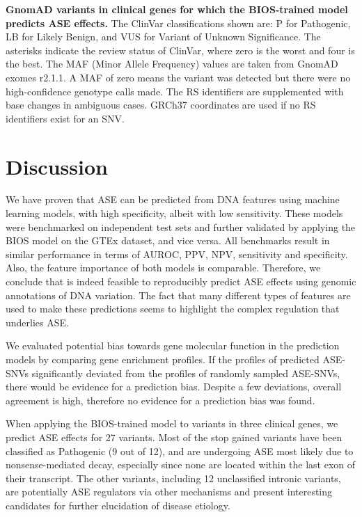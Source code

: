 \documentclass{book}
\begin{document}
\begin{refsection}
\begin{table}[!htb]
  \caption[gnomAD variants in clinical genes with ASE predictions]{
    \label{tab:table2}
    \textbf{GnomAD variants in clinical genes for which the BIOS-trained model predicts ASE effects.}
    The ClinVar classifications shown are: P for Pathogenic, LB for Likely Benign, and VUS for Variant of Unknown Significance.
    The asterisks indicate the review status of ClinVar, where zero is the worst and four is the best.
    The MAF (Minor Allele Frequency) values are taken from GnomAD exomes r2.1.1.
    A MAF of zero means the variant was detected but there were no high-confidence genotype calls made. 
    The RS identifiers are supplemented with base changes in ambiguous cases.
    GRCh37 coordinates are used if no RS identifiers exist for an SNV.
    }
\end{table}

\section*{Discussion} %
We have proven that ASE can be predicted from DNA features using machine learning models, with high specificity, albeit with low sensitivity. 
These models were benchmarked on independent test sets and further validated by applying the BIOS model on the GTEx dataset, and vice versa.
All benchmarks result in similar performance in terms of AUROC, PPV, NPV, sensitivity and specificity.
Also, the feature importance of both models is comparable.
Therefore, we conclude that is indeed feasible to reproducibly predict ASE effects using genomic annotations of DNA variation.
The fact that many different types of features are used to make these predictions seems to highlight the complex regulation that underlies ASE.

We evaluated potential bias towards gene molecular function in the prediction models by comparing gene enrichment profiles.
If the profiles of predicted ASE-SNVs significantly deviated from the profiles of randomly sampled ASE-SNVs, there would be evidence for a prediction bias.
Despite a few deviations, overall agreement is high, therefore no evidence for a prediction bias was found.

When applying the BIOS-trained model to variants in three clinical genes, we predict ASE effects for 27 variants.
Most of the stop gained variants have been classified as Pathogenic (9 out of 12), and are undergoing ASE most likely due to nonsense-mediated decay, especially since none are located within the last exon of their transcript.
The other variants, including 12 unclassified intronic variants, are potentially ASE regulators via other mechanisms and present interesting candidates for further elucidation of disease etiology.


\end{refsection}
\end{document}
